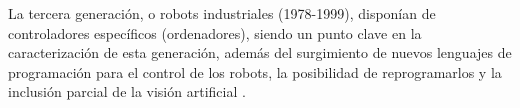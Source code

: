   
  
  
  
La tercera generación, o robots industriales (1978-1999), disponían de controladores específicos (ordenadores), siendo un punto clave en la caracterización de esta generación, además del surgimiento de nuevos lenguajes de programación para el control de los robots, la posibilidad de reprogramarlos y la inclusión parcial de la visión artificial \cite{Zamalloa17}. %

